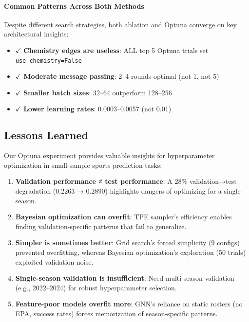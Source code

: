\paragraph{Common Patterns Across Both Methods}

Despite different search strategies, both ablation and Optuna converge on key architectural insights:

\begin{itemize}[noitemsep]
    \item $\checkmark$ \textbf{Chemistry edges are useless}: ALL top 5 Optuna trials set \texttt{use\_chemistry=False}
    \item $\checkmark$ \textbf{Moderate message passing}: 2--4 rounds optimal (not 1, not 5)
    \item $\checkmark$ \textbf{Smaller batch sizes}: 32--64 outperform 128--256
    \item $\checkmark$ \textbf{Lower learning rates}: 0.0003--0.0057 (not 0.01)
\end{itemize}

\subsection{Lessons Learned}
\label{subsec:optuna_lessons}

Our Optuna experiment provides valuable insights for hyperparameter optimization in small-sample sports prediction tasks:

\begin{enumerate}
    \item \textbf{Validation performance ≠ test performance}: A 28\% validation→test degradation (0.2263 → 0.2890) highlights dangers of optimizing for a single season.

    \item \textbf{Bayesian optimization can overfit}: TPE sampler's efficiency enables finding validation-specific patterns that fail to generalize.

    \item \textbf{Simpler is sometimes better}: Grid search's forced simplicity (9 configs) prevented overfitting, whereas Bayesian optimization's exploration (50 trials) exploited validation noise.

    \item \textbf{Single-season validation is insufficient}: Need multi-season validation (e.g., 2022--2024) for robust hyperparameter selection.

    \item \textbf{Feature-poor models overfit more}: GNN's reliance on static rosters (no EPA, success rates) forces memorization of season-specific patterns.
\end{enumerate}

